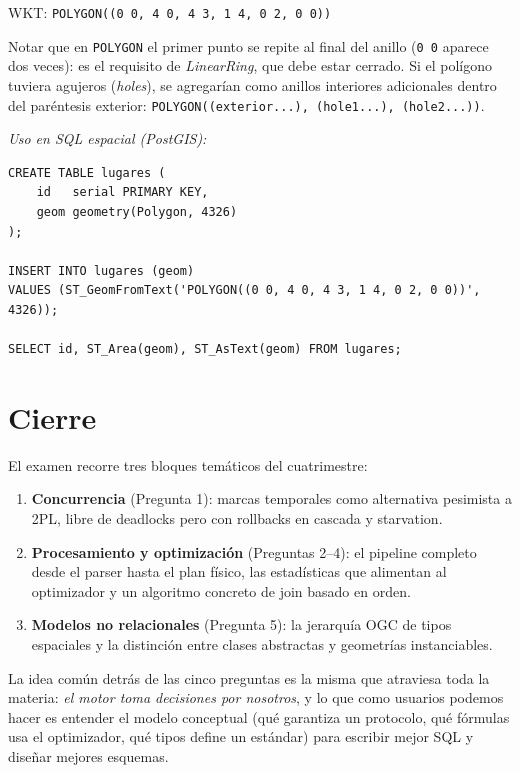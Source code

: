 \documentclass[11pt,a4paper]{article}
\begin{document}
WKT: \texttt{POLYGON((0 0, 4 0, 4 3, 1 4, 0 2, 0 0))}

\begin{nota}
Notar que en \texttt{POLYGON} el primer punto se repite al final del anillo (\texttt{0 0} aparece dos veces): es el requisito de \emph{LinearRing}, que debe estar cerrado. Si el polígono tuviera agujeros (\emph{holes}), se agregarían como anillos interiores adicionales dentro del paréntesis exterior: \texttt{POLYGON((exterior...), (hole1...), (hole2...))}.
\end{nota}

\textit{Uso en SQL espacial (PostGIS):}

\begin{lstlisting}[style=plain]
CREATE TABLE lugares (
    id   serial PRIMARY KEY,
    geom geometry(Polygon, 4326)
);

INSERT INTO lugares (geom)
VALUES (ST_GeomFromText('POLYGON((0 0, 4 0, 4 3, 1 4, 0 2, 0 0))', 4326));

SELECT id, ST_Area(geom), ST_AsText(geom) FROM lugares;
\end{lstlisting}

\section*{Cierre}

El examen recorre tres bloques temáticos del cuatrimestre:

\begin{enumerate}
    \item \textbf{Concurrencia} (Pregunta 1): marcas temporales como alternativa pesimista a 2PL, libre de deadlocks pero con rollbacks en cascada y starvation.
    \item \textbf{Procesamiento y optimización} (Preguntas 2--4): el pipeline completo desde el parser hasta el plan físico, las estadísticas que alimentan al optimizador y un algoritmo concreto de join basado en orden.
    \item \textbf{Modelos no relacionales} (Pregunta 5): la jerarquía OGC de tipos espaciales y la distinción entre clases abstractas y geometrías instanciables.
\end{enumerate}

La idea común detrás de las cinco preguntas es la misma que atraviesa toda la materia: \emph{el motor toma decisiones por nosotros}, y lo que como usuarios podemos hacer es entender el modelo conceptual (qué garantiza un protocolo, qué fórmulas usa el optimizador, qué tipos define un estándar) para escribir mejor SQL y diseñar mejores esquemas.
\end{document}
